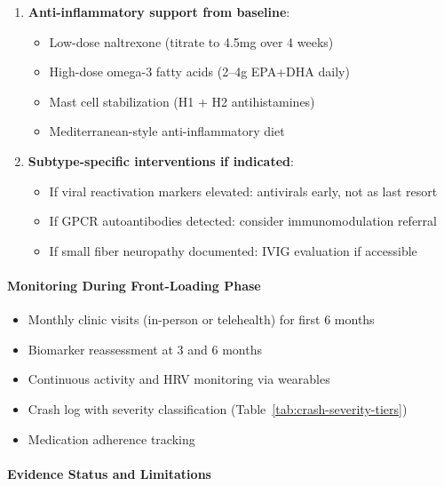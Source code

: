 \begin{enumerate}
    \item \textbf{Anti-inflammatory support from baseline}:
    \begin{itemize}
        \item Low-dose naltrexone (titrate to 4.5mg over 4 weeks)
        \item High-dose omega-3 fatty acids (2--4g EPA+DHA daily)
        \item Mast cell stabilization (H1 + H2 antihistamines)
        \item Mediterranean-style anti-inflammatory diet
    \end{itemize}

    \item \textbf{Subtype-specific interventions if indicated}:
    \begin{itemize}
        \item If viral reactivation markers elevated: antivirals early, not as last resort
        \item If GPCR autoantibodies detected: consider immunomodulation referral
        \item If small fiber neuropathy documented: IVIG evaluation if accessible
    \end{itemize}
\end{enumerate}

\paragraph{Monitoring During Front-Loading Phase}

\begin{itemize}
    \item Monthly clinic visits (in-person or telehealth) for first 6 months
    \item Biomarker reassessment at 3 and 6 months
    \item Continuous activity and HRV monitoring via wearables
    \item Crash log with severity classification (Table~\ref{tab:crash-severity-tiers})
    \item Medication adherence tracking
\end{itemize}

\paragraph{Evidence Status and Limitations}

